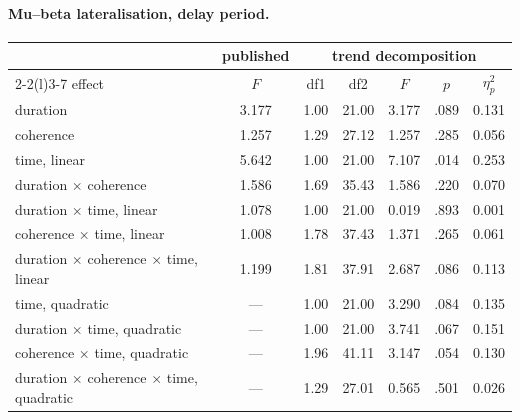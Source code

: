 \paragraph{Mu--beta lateralisation, delay period.}
\begin{center}\small
\begin{tabular}{lcccccc}
\toprule
 & \multicolumn{1}{c}{published} & \multicolumn{5}{c}{trend decomposition}\\
\cmidrule(lr){2-2}\cmidrule(l){3-7}
effect & $F$ & df1 & df2 & $F$ & $p$ & $\eta_p^2$\\
\midrule
duration & 3.177 & 1.00 & 21.00 & 3.177 & .089 & 0.131\\
coherence & 1.257 & 1.29 & 27.12 & 1.257 & .285 & 0.056\\
time, linear & 5.642 & 1.00 & 21.00 & 7.107 & .014 & 0.253\\
duration $\times$ coherence & 1.586 & 1.69 & 35.43 & 1.586 & .220 & 0.070\\
duration $\times$ time, linear & 1.078 & 1.00 & 21.00 & 0.019 & .893 & 0.001\\
coherence $\times$ time, linear & 1.008 & 1.78 & 37.43 & 1.371 & .265 & 0.061\\
duration $\times$ coherence $\times$ time, linear & 1.199 & 1.81 & 37.91 & 2.687 & .086 & 0.113\\
time, quadratic & --- & 1.00 & 21.00 & 3.290 & .084 & 0.135\\
duration $\times$ time, quadratic & --- & 1.00 & 21.00 & 3.741 & .067 & 0.151\\
coherence $\times$ time, quadratic & --- & 1.96 & 41.11 & 3.147 & .054 & 0.130\\
duration $\times$ coherence $\times$ time, quadratic & --- & 1.29 & 27.01 & 0.565 & .501 & 0.026\\
\bottomrule
\end{tabular}
\end{center}

